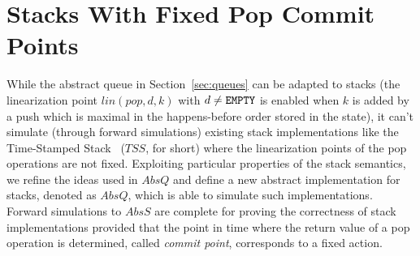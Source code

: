 \vspace{-3.5mm}
\section{Stacks With Fixed Pop Commit Points}\label{sec:stacks}
\vspace{-1.5mm}
While the abstract queue in Section~\ref{sec:queues} can be adapted to stacks (the linearization point $lin(pop,d,k)$ with $d\neq{\tt EMPTY}$ is enabled when $k$ is added by a push which is maximal in the happens-before order stored in the state), it can't simulate (through forward simulations) existing stack implementations like the Time-Stamped Stack~\cite{DBLP:conf/popl/DoddsHK15} ($\mathit{TSS}$, for short) where the linearization points of the pop operations are not fixed. Exploiting particular properties of the stack semantics, we refine the ideas used in $AbsQ$ and define 
a new abstract implementation for stacks, denoted as $AbsQ$, which is able to simulate such implementations. Forward simulations to $AbsS$ are complete for proving the correctness of stack implementations provided that the point in time where the return value of a pop operation is determined, called \emph{commit point}, corresponds to a fixed action.

\vspace{-3.5mm}
